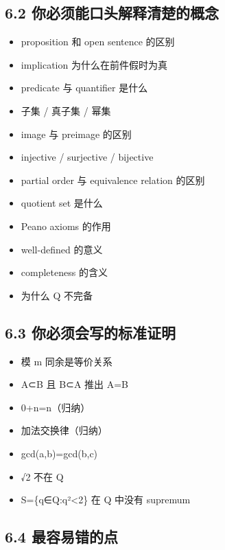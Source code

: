 \documentclass[
  11pt,
]{article}
\providecommand{\tightlist}{%
  \setlength{\itemsep}{0pt}\setlength{\parskip}{0pt}}
\begin{document}
\subsection{6.2
你必须能口头解释清楚的概念}\label{ux4f60ux5fc5ux987bux80fdux53e3ux5934ux89e3ux91caux6e05ux695aux7684ux6982ux5ff5}

\begin{itemize}
\tightlist
\item
  proposition 和 open sentence 的区别
\item
  implication 为什么在前件假时为真
\item
  predicate 与 quantifier 是什么
\item
  子集 / 真子集 / 幂集
\item
  image 与 preimage 的区别
\item
  injective / surjective / bijective
\item
  partial order 与 equivalence relation 的区别
\item
  quotient set 是什么
\item
  Peano axioms 的作用
\item
  well-defined 的意义
\item
  completeness 的含义
\item
  为什么 Q 不完备
\end{itemize}

\subsection{6.3
你必须会写的标准证明}\label{ux4f60ux5fc5ux987bux4f1aux5199ux7684ux6807ux51c6ux8bc1ux660e}

\begin{itemize}
\tightlist
\item
  模 m 同余是等价关系
\item
  A⊂B 且 B⊂A 推出 A=B
\item
  0+n=n（归纳）
\item
  加法交换律（归纳）
\item
  gcd(a,b)=gcd(b,c)
\item
  √2 不在 Q
\item
  S=\{q∈Q:q²\textless2\} 在 Q 中没有 supremum
\end{itemize}

\subsection{6.4
最容易错的点}\label{ux6700ux5bb9ux6613ux9519ux7684ux70b9}
\end{document}
